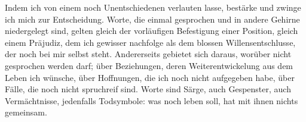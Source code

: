 Indem ich von einem noch Unentschiedenen verlauten lasse, bestärke und zwinge ich mich zur Entscheidung. Worte, die einmal gesprochen und in andere Gehirne niedergelegt sind, gelten gleich der vorläufigen Befestigung einer Position, gleich einem Präjudiz, dem ich gewisser nachfolge als dem blossen Willensentschlusse, der noch bei mir selbst steht. Andererseits gebietet sich daraus, worüber nicht gesprochen werden darf; über Beziehungen, deren Weiterentwickelung aus dem Leben ich wünsche, über Hoffnungen, die ich noch nicht aufgegeben habe, über Fälle, die noch nicht spruchreif sind. Worte sind Särge, auch Gespenster, auch Vermächtnisse, jedenfalls Todsymbole: was noch leben soll, hat mit ihnen nichts gemeinsam.
\par

